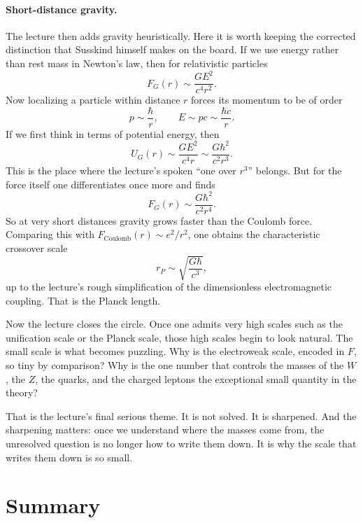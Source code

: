 \paragraph{Short-distance gravity.}
The lecture then adds gravity heuristically. Here it is worth keeping the corrected distinction that Susskind himself makes on the board. If we use energy rather than rest mass in Newton's law, then for relativistic particles
\begin{equation}
F_G(r)\sim \frac{GE^2}{c^4r^2}.
\end{equation}
Now localizing a particle within distance \(r\) forces its momentum to be of order
\begin{equation}
p\sim \frac{\hbar}{r},
\qquad
E\sim pc\sim \frac{\hbar c}{r}.
\end{equation}
If we first think in terms of potential energy, then
\begin{equation}
U_G(r)\sim \frac{GE^2}{c^4r}
\sim
\frac{G\hbar^2}{c^2r^3}.
\end{equation}
This is the place where the lecture's spoken ``one over \(r^3\)'' belongs. But for the force itself one differentiates once more and finds
\begin{equation}
F_G(r)\sim \frac{G\hbar^2}{c^2r^4}.
\end{equation}
So at very short distances gravity grows faster than the Coulomb force. Comparing this with \(F_{\mathrm{Coulomb}}(r)\sim e^2/r^2\), one obtains the characteristic crossover scale
\begin{equation}
r_P\sim \sqrt{\frac{G\hbar}{c^3}},
\end{equation}
up to the lecture's rough simplification of the dimensionless electromagnetic coupling. That is the Planck length.

Now the lecture closes the circle. Once one admits very high scales such as the unification scale or the Planck scale, those high scales begin to look natural. The small scale is what becomes puzzling. Why is the electroweak scale, encoded in \(F\), so tiny by comparison? Why is the one number that controls the masses of the \(W\), the \(Z\), the quarks, and the charged leptons the exceptional small quantity in the theory?

That is the lecture's final serious theme. It is not solved. It is sharpened. And the sharpening matters: once we understand where the masses come from, the unresolved question is no longer how to write them down. It is why the scale that writes them down is so small.

\section{Summary}

